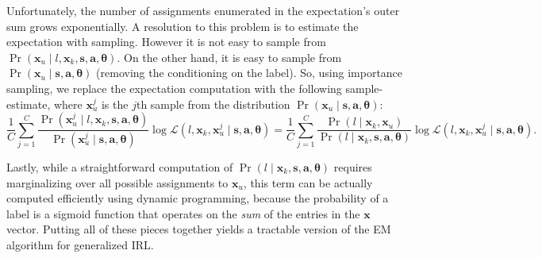 \noindent
Unfortunately, 
the number of assignments enumerated in the expectation's outer sum
grows exponentially.  A resolution to this problem is to estimate the
expectation with sampling.  However
it is not easy to sample from $\Pr(\bm{x}_u \mid l, \bm{x}_k, \bm{s}, 
\bm{a}, \bm{\theta})$.
On the other hand, it is easy to sample
from $\Pr(\bm{x}_u \mid \bm{s}, \bm{a}, \bm{\theta})$ (removing the
conditioning on the label). 
So, using importance sampling, we replace the expectation computation
with the following sample-estimate,
where $\bm{x}_u^j$ is the $j$th sample from the distribution $\Pr(\bm{x}_u \mid \bm{s}, \bm{a}, \bm{\theta})$:
\begin{equation}
\frac{1}{C} \sum_{j=1}^C 
\frac{\Pr(\bm{x}_u^j \mid l, \bm{x}_k, \bm{s}, \bm{a}, \bm{\theta})}{\Pr(\bm{x}_u^j \mid \bm{s}, \bm{a}, \bm{\theta})} 
\log\mathcal{L}(l, \bm{x}_k, \bm{x}_u^j \mid \bm{s}, \bm{a}, \bm{\theta})
= 
\frac{1}{C} \sum_{j=1}^C 
\frac{\Pr(l \mid \bm{x}_k, \bm{x}_u)}{\Pr(l \mid \bm{x}_k, \bm{s}, \bm{a}, \bm{\theta})}
\log\mathcal{L}(l, \bm{x}_k, \bm{x}_u^j \mid \bm{s}, \bm{a}, \bm{\theta}).
\end{equation}

Lastly, while a straightforward computation of
$\Pr(l \mid \bm{x}_k, \bm{s}, \bm{a}, \bm{\theta})$ requires
marginalizing over all possible assignments to $\bm{x}_u$, this term
can be actually computed efficiently using dynamic programming,
because the probability of a label is a sigmoid function that operates
on the \emph{sum\/} of the entries in the $\bm{x}$ vector.
%
Putting all of these pieces together yields a tractable version of the
EM algorithm for generalized IRL.

